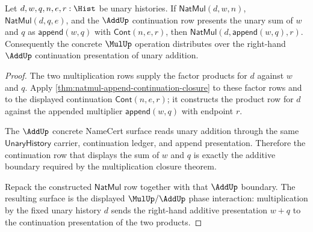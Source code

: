 \begin{theorem}
\label{thm:natmul-additive-right-distributivity-surface}
Let $d,w,q,n,e,r:\Hist$ be unary histories. If $\mathsf{NatMul}(d,w,n)$,
$\mathsf{NatMul}(d,q,e)$, and the $\AddUp$ continuation row presents the
unary sum of $w$ and $q$ as $\mathsf{append}(w,q)$ with $\mathsf{Cont}(n,e,r)$,
then $\mathsf{NatMul}(d,\mathsf{append}(w,q),r)$. Consequently the concrete
$\MulUp$ operation distributes over the right-hand $\AddUp$ continuation
presentation of unary addition.
\end{theorem}
\begin{proof}
The two multiplication rows supply the factor products for $d$ against $w$
and $q$. Apply \autoref{thm:natmul-append-continuation-closure} to these
factor rows and to the displayed continuation $\mathsf{Cont}(n,e,r)$; it
constructs the product row for $d$ against the appended multiplier
$\mathsf{append}(w,q)$ with endpoint $r$.

The $\AddUp$ concrete NameCert surface reads unary addition through the same
$\mathsf{UnaryHistory}$ carrier, continuation ledger, and append
presentation. Therefore the continuation row that displays the sum of $w$ and
$q$ is exactly the additive boundary required by the multiplication closure
theorem.

Repack the constructed $\mathsf{NatMul}$ row together with that $\AddUp$
boundary. The resulting surface is the displayed $\MulUp/\AddUp$ phase
interaction: multiplication by the fixed unary history $d$ sends the
right-hand additive presentation $w+q$ to the continuation presentation of the
two products.
\end{proof}

